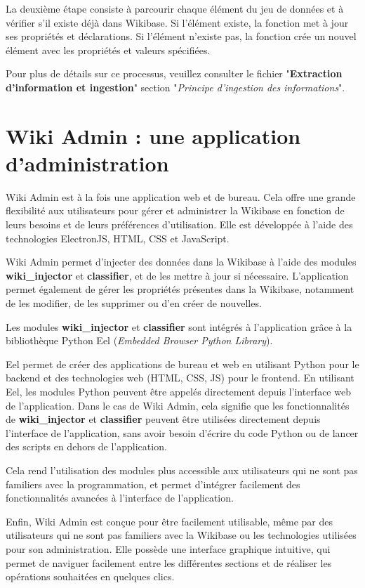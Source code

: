\documentclass[a4paper, 12pt]{article}
\begin{document}
La deuxième étape consiste à parcourir chaque élément du jeu de données et à vérifier s'il existe déjà dans Wikibase. Si l'élément existe, la fonction met à jour ses propriétés et déclarations. Si l'élément n'existe pas, la fonction crée un nouvel élément avec les propriétés et valeurs spécifiées. 

Pour plus de détails sur ce processus, veuillez consulter le fichier "\textbf{Extraction d’information et ingestion}" section "\textit{Principe d’ingestion des informations}".


\section{Wiki Admin : une application d'administration}

Wiki Admin est à la fois une application web et de bureau. Cela offre une grande flexibilité aux utilisateurs pour gérer et administrer la Wikibase en fonction de leurs besoins et de leurs préférences d'utilisation.
Elle est développée à l'aide des technologies ElectronJS, HTML, CSS et JavaScript.

Wiki Admin permet d'injecter des données dans la Wikibase à l'aide des modules \textbf{wiki\_injector} et \textbf{classifier}, et de les mettre à jour si nécessaire. L'application permet également de gérer les propriétés présentes dans la Wikibase, notamment de les modifier, de les supprimer ou d'en créer de nouvelles.

Les modules \textbf{wiki\_injector} et \textbf{classifier} sont intégrés à l'application grâce à la bibliothèque Python Eel (\textit{Embedded Browser Python Library}).

Eel permet de créer des applications de bureau et web en utilisant Python pour le backend et des technologies web (HTML, CSS, JS) pour le frontend. En utilisant Eel, les modules Python peuvent être appelés directement depuis l'interface web de l'application. Dans le cas de Wiki Admin, cela signifie que les fonctionnalités de \textbf{wiki\_injector} et \textbf{classifier} peuvent être utilisées directement depuis l'interface de l'application, sans avoir besoin d'écrire du code Python ou de lancer des scripts en dehors de l'application.

Cela rend l'utilisation des modules plus accessible aux utilisateurs qui ne sont pas familiers avec la programmation, et permet d'intégrer facilement des fonctionnalités avancées à l'interface de l'application.

Enfin, Wiki Admin est conçue pour être facilement utilisable, même par des utilisateurs qui ne sont pas familiers avec la Wikibase ou les technologies utilisées pour son administration. Elle possède une interface graphique intuitive, qui permet de naviguer facilement entre les différentes sections et de réaliser les opérations souhaitées en quelques clics.
\end{document}
